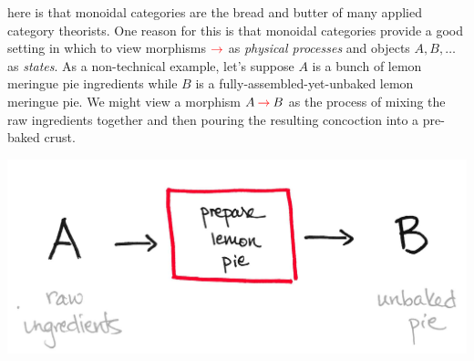 \documentclass{tufte-handout-tai}
\newcounter{dummy} %
\theoremstyle{plain}
\theoremstyle{definition}
\theoremstyle{remark}
\begin{document}
 here is that monoidal categories are the bread and butter of many applied category theorists. One reason for this is that monoidal categories provide a good setting in which to view morphisms ${\color{red}\to}$ as \textit{physical processes} and objects $A,B,\ldots$ as \textit{states}. As a non-technical example, let's suppose $A$ is a bunch of lemon meringue pie ingredients while $B$ is a fully-assembled-yet-unbaked lemon meringue pie. We might view a morphism $A\:{\color{red}\to}\:B$ as the process of mixing the raw ingredients together and then pouring the resulting concoction into a pre-baked crust.
\begin{center}
\label{fig:pie}
\includegraphics[width=!,totalheight=!,scale=0.4]{pie2.jpg}
\end{center}
\end{document}
